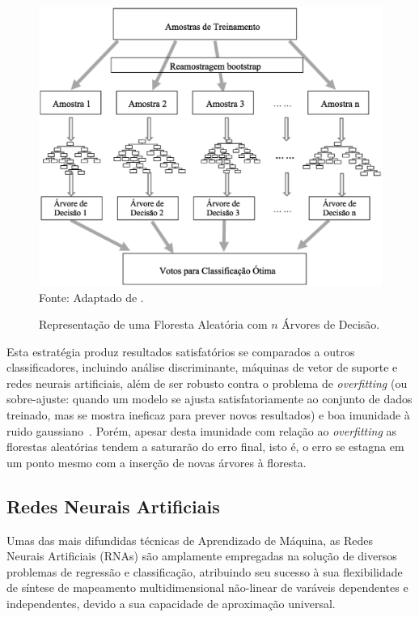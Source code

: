 \begin{figure}[!htb]
	\centering
	\caption{Representação de uma Floresta Aleatória com $n$ Árvores de Decisão.}
	\includegraphics[width=0.8\linewidth]{RF_esquema.eps}\\
	{\small Fonte: Adaptado de .}
	\label{fig:rf_esquema}
\end{figure}

Esta estratégia produz resultados satisfatórios se comparados a outros classificadores, incluindo análise discriminante, máquinas de vetor de suporte e redes neurais artificiais, além de ser robusto contra o problema de \textit{overfitting} (ou sobre-ajuste: quando um modelo se ajusta satisfatoriamente ao conjunto de dados treinado, mas se mostra ineficaz para prever novos resultados) \cite{breiman1999random} e boa imunidade à ruido gaussiano~\cite{zang2017}. Porém, apesar desta imunidade com relação ao \textit{overfitting} as florestas aleatórias tendem a saturarão do erro final, isto é, o erro se estagna em um ponto mesmo com a inserção de novas árvores à floresta.
 

\subsection{Redes Neurais Artificiais}

Umas das mais difundidas técnicas de Aprendizado de Máquina, as Redes Neurais Artificiais (RNAs) são amplamente empregadas na solução de diversos problemas de regressão e classificação, atribuindo seu sucesso à sua flexibilidade de síntese de mapeamento multidimensional não-linear de varáveis dependentes e independentes, devido a sua capacidade de aproximação universal.

